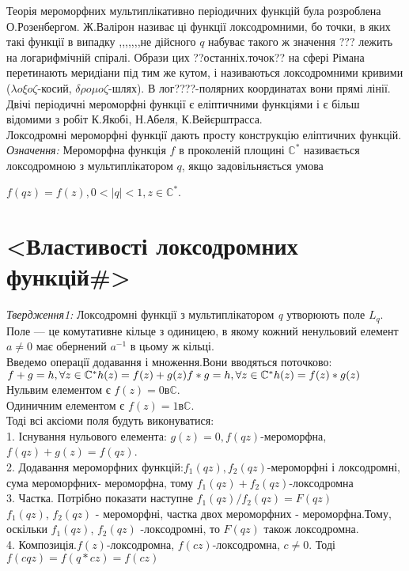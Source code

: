 \documentclass[12pt,a4paper]{article}
\begin{document}
Теорія мероморфних мультиплікативно періодичних функцій була розроблена О.Розенбергом. Ж.Валірон називає ці функції локсодромними, бо точки, в яких такі функції в випадку ,,,,,,,не дійсного $q$ набуває такого ж значення ??? лежить на логарифмічній спіралі. Образи цих ??останніх.точок?? на сфері Рімана перетинають меридіани під тим же кутом, і називаються локсодромними кривими ($\lambda o \xi o\zeta$-косий, $\delta \rho o \mu o\zeta$-шлях). В лог????-полярних координатах вони прямі лінії.\\
Двічі періодичні мероморфні функції є еліптичними функціями і є більш відомими з робіт К.Якобі, Н.Абеля, К.Вейєрштрасса.\\
Локсодромні мероморфні функції дають просту конструкцію еліптичних функцій.\\

\emph{Означення:} Мероморфна функція $f$ в проколеній площині $\mathbb{C}^{*}$ називається локсодромною з мультиплікатором $q$, якщо задовільняється умова \begin{center}
$f(qz)=f(z), 0<\vert q \vert<1, z\in \mathbb{C}^{*}.$
\end{center}

\clearpage

\section{<Властивості локсодромних функцій\#>}

\emph{Твердження1:} Локсодромні функції з мультиплікатором \textit{q} утворюють поле $L_{q}$. \\
Поле — це комутативне кільце з одиницею, в якому кожний ненульовий елемент $a\neq 0$ має обернений $a^{-1}$ в цьому ж кільці.\\
Введемо операції додавання і множення.Вони вводяться поточково:\\
$f+g=h, \forall z \in \mathbb{C}^{*} h(z)=f(z)+g(z)\\
f*g=h, \forall z \in \mathbb{C}^{*} h(z)=f(z)*g(z)$\\
Нульвим елементом є $f(z)=0 в \mathbb{C}$.\\
Одиничним елементом є $f(z)=1 в \mathbb{C}$.\\
Тоді всі аксіоми поля будуть виконуватися:\\
1. Існування нульового елемента: $g(z)=0, f(qz)$-мероморфна, $f(qz)+g(z)=f(qz)$.\\
2. Додавання мероморфних функцій:$f_{1}(qz),f_{2}(qz)$-мероморфні і локсодромні, сума мероморфних- мероморфна, тому $f_{1}(qz)+f_{2}(qz)$-локсодромна \\
3. Частка. Потрібно показати наступне $f_{1}(qz)/f_{2}(qz)=F(qz)$\\
$f_{1}(qz)$, $f_{2}(qz)$ - мероморфні, частка двох мероморфних - мероморфна.Тому, оскільки $f_{1}(qz)$, $f_{2}(qz)$ -локсодромні, то $ F(qz)$ також локсодромна.\\
4. Композиція.$f(z)$-локсодромна, $f(cz)$-локсодромна, $c \neq 0$. Тоді  $f(cqz)=f(q*cz)=f(cz)$\\
\end{document}
